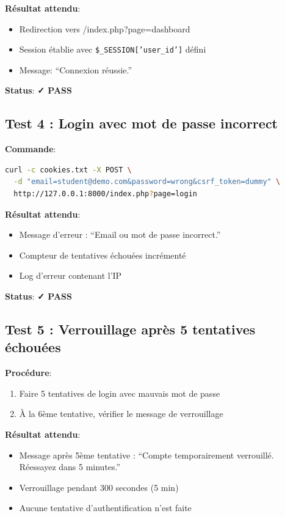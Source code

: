 \documentclass[11pt,a4paper,french]{report}
\newcommand{\pass}{\cellcolor{pass}\textbf{\color{white}✓ PASS}}
\begin{document}
\textbf{Résultat attendu}:
\begin{itemize}
    \item Redirection vers /index.php?page=dashboard
    \item Session établie avec \texttt{\$\_SESSION['user\_id']} défini
    \item Message: ``Connexion réussie.''
\end{itemize}

\textbf{Status}: \pass

\subsection{Test 4 : Login avec mot de passe incorrect}

\textbf{Commande}:
\begin{lstlisting}[language=bash]
curl -c cookies.txt -X POST \
  -d "email=student@demo.com&password=wrong&csrf_token=dummy" \
  http://127.0.0.1:8000/index.php?page=login
\end{lstlisting}

\textbf{Résultat attendu}:
\begin{itemize}
    \item Message d'erreur : ``Email ou mot de passe incorrect.''
    \item Compteur de tentatives échouées incrémenté
    \item Log d'erreur contenant l'IP
\end{itemize}

\textbf{Status}: \pass

\subsection{Test 5 : Verrouillage après 5 tentatives échouées}

\textbf{Procédure}:
\begin{enumerate}
    \item Faire 5 tentatives de login avec mauvais mot de passe
    \item À la 6ème tentative, vérifier le message de verrouillage
\end{enumerate}

\textbf{Résultat attendu}:
\begin{itemize}
    \item Message après 5ème tentative : ``Compte temporairement verrouillé. Réessayez dans 5 minutes.''
    \item Verrouillage pendant 300 secondes (5 min)
    \item Aucune tentative d'authentification n'est faite
\end{itemize}
\end{document}
